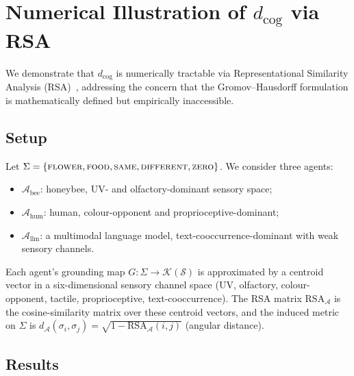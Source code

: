 
\appendix
\section{Numerical Illustration of $d_{\mathrm{cog}}$ via RSA}
\label{app:dcog-numerical}

We demonstrate that $d_{\mathrm{cog}}$ is numerically tractable via
Representational Similarity Analysis (RSA)~\cite{kriegeskorte2008},
addressing the concern that the Gromov--Hausdorff formulation is
mathematically defined but empirically inaccessible.

\subsection*{Setup}

Let $\Sigma = \{\textsc{flower}, \textsc{food}, \textsc{same},
\textsc{different}, \textsc{zero}\}$. We consider three agents:

\begin{itemize}[noitemsep]
  \item $\mathcal{A}_{\mathrm{bee}}$: honeybee, UV- and
    olfactory-dominant sensory space;
  \item $\mathcal{A}_{\mathrm{hum}}$: human, colour-opponent and
    proprioceptive-dominant;
  \item $\mathcal{A}_{\mathrm{llm}}$: a multimodal language model,
    text-cooccurrence-dominant with weak sensory channels.
\end{itemize}

Each agent's grounding map $G: \Sigma \to \mathcal{K}(\mathcal{S})$ is
approximated by a centroid vector in a six-dimensional sensory channel
space (UV, olfactory, colour-opponent, tactile, proprioceptive,
text-cooccurrence). The RSA matrix $\mathrm{RSA}_{\mathcal{A}}$ is the
cosine-similarity matrix over these centroid vectors, and the induced
metric on $\Sigma$ is $d_{\mathcal{A}}(\sigma_i, \sigma_j) =
\sqrt{1 - \mathrm{RSA}_{\mathcal{A}}(i,j)}$ (angular distance).

\subsection*{Results}

